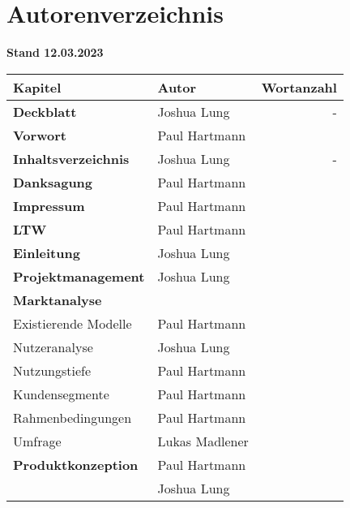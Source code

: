 \section{Autorenverzeichnis}

\textbf{Stand 12.03.2023}

\begin{longtable}{l|l|r}
  \textbf{Kapitel}                       & \textbf{Autor} & \textbf{Wortanzahl} \\ \hline\hline
  \textbf{Deckblatt}                     & Joshua Lung    & -                   \\ \hline
  \textbf{Vorwort}                       & Paul Hartmann  &                     \\ \hline
  \textbf{Inhaltsverzeichnis}            & Joshua Lung    & -                   \\ \hline
  \textbf{Danksagung}                    & Paul Hartmann  &                     \\ \hline
  \textbf{Impressum}                     & Paul Hartmann  &                     \\ \hline
  \textbf{LTW}                           & Paul Hartmann  &                     \\ \hline
  \textbf{Einleitung}                    & Joshua Lung    &                     \\ \hline
  \textbf{Projektmanagement}             & Joshua Lung    &                     \\ \hline
  \textbf{Marktanalyse}                  &                &                     \\ \hline
  Existierende Modelle                   & Paul Hartmann  &                     \\ \hline
  Nutzeranalyse                          & Joshua Lung    &                     \\ \hline
  Nutzungstiefe                          & Paul Hartmann  &                     \\ \hline
  Kundensegmente                         & Paul Hartmann  &                     \\ \hline
  Rahmenbedingungen                      & Paul Hartmann  &                     \\ \hline
  Umfrage                                & Lukas Madlener &                     \\ \hline
  \textbf{Produktkonzeption}             & Paul Hartmann  &                     \\
                                         & Joshua Lung    &                     \\

\end{longtable}
